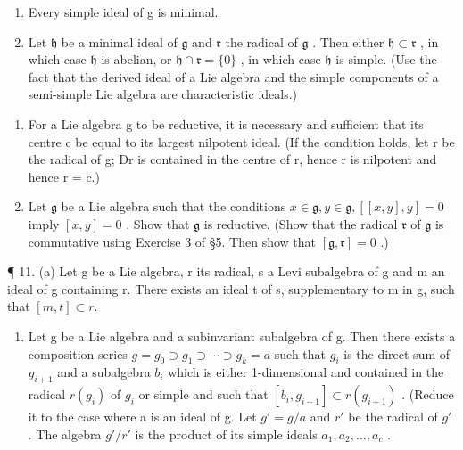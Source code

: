 \begin{enumerate}
\def\labelenumi{(\alph{enumi})}
\item
  Every simple ideal of g is minimal.
\item
  Let \(\mathfrak{h}\) be a minimal ideal of \(\mathfrak{g}\) and \(\mathfrak{r}\) the radical of \(\mathfrak{g}\) . Then either \(\mathfrak{h} \subset \mathfrak{r}\) , in which case \(\mathfrak{h}\) is abelian, or \(\mathfrak{h} \cap \mathfrak{r} = \{0\}\) , in which case \(\mathfrak{h}\) is simple. (Use the fact that the derived ideal of a Lie algebra and the simple components of a semi-simple Lie algebra are characteristic ideals.)
\end{enumerate}

\begin{enumerate}
\def\labelenumi{\arabic{enumi}.}
\setcounter{enumi}{8}
\item
  For a Lie algebra g to be reductive, it is necessary and sufficient that its centre c be equal to its largest nilpotent ideal. (If the condition holds, let r be the radical of g; Dr is contained in the centre of r, hence r is nilpotent and hence r = c.)
\item
  Let \(\mathfrak{g}\) be a Lie algebra such that the conditions \(x \in \mathfrak{g}, y \in \mathfrak{g}, [[x, y], y] = 0\) imply \([x, y] = 0\) . Show that \(\mathfrak{g}\) is reductive. (Show that the radical \(\mathfrak{r}\) of \(\mathfrak{g}\) is commutative using Exercise 3 of §5. Then show that \([\mathfrak{g}, \mathfrak{r}] = 0\) .)
\end{enumerate}

¶ 11. (a) Let g be a Lie algebra, r its radical, s a Levi subalgebra of g and m an ideal of g containing r. There exists an ideal t of s, supplementary to m in g, such that \([m, t] \subset r\).

\begin{enumerate}
\def\labelenumi{(\alph{enumi})}
\setcounter{enumi}{1}
\tightlist
\item
  Let g be a Lie algebra and a subinvariant subalgebra of g. Then there exists a composition series \(g = g_{0} \supset g_{1} \supset \cdots \supset g_{k} = a\) such that \(g_{i}\) is the direct sum of \(g_{i+1}\) and a subalgebra \(b_{i}\) which is either 1-dimensional and contained in the radical \(r(g_{i})\) of \(g_{i}\) or simple and such that \([b_{i}, g_{i+1}] \subset r(g_{i+1})\) . (Reduce it to the case where a is an ideal of g. Let \(g' = g/a\) and \(r'\) be the radical of \(g'\) . The algebra \(g'/r'\) is the product of its simple ideals \(a_{1}, a_{2}, \ldots, a_{c}\) .
\end{enumerate}

